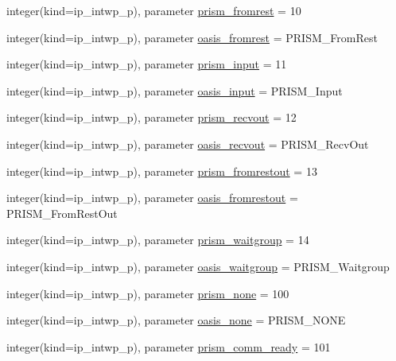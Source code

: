 \begin{DoxyCompactItemize}
\item 
integer(kind=ip\+\_\+intwp\+\_\+p), parameter \hyperlink{namespacemod__oasis__parameters_ad77e6f35280cf4e306f818f9ec815441}{prism\+\_\+fromrest} = 10
\item 
integer(kind=ip\+\_\+intwp\+\_\+p), parameter \hyperlink{namespacemod__oasis__parameters_aa0584909970d34364b7ec319292b1682}{oasis\+\_\+fromrest} = P\+R\+I\+S\+M\+\_\+\+From\+Rest
\item 
integer(kind=ip\+\_\+intwp\+\_\+p), parameter \hyperlink{namespacemod__oasis__parameters_aa9009f13473f2cb6476c2fb5e4963243}{prism\+\_\+input} = 11
\item 
integer(kind=ip\+\_\+intwp\+\_\+p), parameter \hyperlink{namespacemod__oasis__parameters_ae65ca856d776de249fc624b2d76bc4e8}{oasis\+\_\+input} = P\+R\+I\+S\+M\+\_\+\+Input
\item 
integer(kind=ip\+\_\+intwp\+\_\+p), parameter \hyperlink{namespacemod__oasis__parameters_ab56f2573ea7fd626f24e42606f4745a2}{prism\+\_\+recvout} = 12
\item 
integer(kind=ip\+\_\+intwp\+\_\+p), parameter \hyperlink{namespacemod__oasis__parameters_ac7406e7f558491599acfbb6f4628f811}{oasis\+\_\+recvout} = P\+R\+I\+S\+M\+\_\+\+Recv\+Out
\item 
integer(kind=ip\+\_\+intwp\+\_\+p), parameter \hyperlink{namespacemod__oasis__parameters_ac989a8af875dd1765b1369814fd4eb9d}{prism\+\_\+fromrestout} = 13
\item 
integer(kind=ip\+\_\+intwp\+\_\+p), parameter \hyperlink{namespacemod__oasis__parameters_a76a87a170e0c08863ae981693eb88fb8}{oasis\+\_\+fromrestout} = P\+R\+I\+S\+M\+\_\+\+From\+Rest\+Out
\item 
integer(kind=ip\+\_\+intwp\+\_\+p), parameter \hyperlink{namespacemod__oasis__parameters_ae5cbdfb558e82bfb8695a8cf425780cb}{prism\+\_\+waitgroup} = 14
\item 
integer(kind=ip\+\_\+intwp\+\_\+p), parameter \hyperlink{namespacemod__oasis__parameters_a2cc23572d33c536d49a53587359b68f0}{oasis\+\_\+waitgroup} = P\+R\+I\+S\+M\+\_\+\+Waitgroup
\item 
integer(kind=ip\+\_\+intwp\+\_\+p), parameter \hyperlink{namespacemod__oasis__parameters_a81e4e20be511cd8be2ab3881b42f8f3e}{prism\+\_\+none} = 100
\item 
integer(kind=ip\+\_\+intwp\+\_\+p), parameter \hyperlink{namespacemod__oasis__parameters_a368402af56fd08ed95ad88d0c987733a}{oasis\+\_\+none} = P\+R\+I\+S\+M\+\_\+\+N\+O\+NE
\item 
integer(kind=ip\+\_\+intwp\+\_\+p), parameter \hyperlink{namespacemod__oasis__parameters_a953f0a4738f9ca919cf5e446998cc79e}{prism\+\_\+comm\+\_\+ready} = 101

\end{DoxyCompactItemize}
